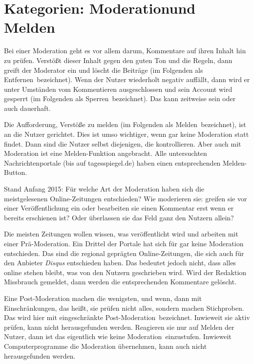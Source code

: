 \section{Kategorien: \glqq Moderation\grqq und \glqq Melden\grqq}

Bei einer Moderation geht es vor allem darum, Kommentare auf ihren Inhalt hin
zu prüfen. Verstößt dieser Inhalt gegen den guten Ton und die Regeln, dann
greift der Moderator ein und löscht die Beiträge (im Folgenden als \glqq
Entfernen\grqq\ bezeichnet). Wenn der Nutzer wiederholt negativ auffällt, dann
wird er unter Umständen vom Kommentieren ausgeschlossen und sein Account wird
gesperrt (im Folgenden als  \glqq Sperren\grqq\ bezeichnet). Das kann zeitweise
sein oder auch dauerhaft.

Die Aufforderung, Verstöße zu melden (im Folgenden als \glqq Melden\grqq\
bezeichnet), ist an die Nutzer gerichtet. Dies ist umso wichtiger, wenn gar
keine Moderation statt findet. Dann sind die Nutzer selbst diejenigen, die
kontrollieren. Aber auch mit Moderation ist eine Melden-Funktion angebracht.
Alle  untersuchten Nachrichtenportale (bis auf tagesspiegel.de) haben einen
entsprechenden Melden-Button.

Stand Anfang 2015: Für welche Art der Moderation haben sich die meistgelesenen
Online-Zeitungen entschieden? Wie moderieren sie: greifen sie vor einer
Veröffentlichung ein oder bearbeiten sie einen Kommentar erst wenn er bereits
erschienen ist? Oder überlassen sie das Feld ganz den Nutzern allein?

Die meisten Zeitungen wollen wissen, was veröffentlicht wird und arbeiten mit
einer Prä-Moderation.  Ein Drittel der Portale hat sich für gar keine
Moderation entschieden. Das sind die regional geprägten Online-Zeitungen, die
sich auch für den Anbieter {\sl Disqus} entschieden haben. Das bedeutet jedoch
nicht, dass alles online stehen bleibt, was von den Nutzern geschrieben wird.
Wird der Redaktion Missbrauch gemeldet, dann werden die entsprechenden
Kommentare gelöscht.

Eine Post-Moderation machen die wenigsten, und wenn, dann mit Einschränkungen,
das heißt, sie prüfen nicht alles, sondern machen Stichproben. Das wird hier mit
\glqq eingeschränkte Post-Moderation\grqq\ bezeichnet. Inwieweit sie aktiv prüfen,
kann nicht herausgefunden werden. Reagieren sie nur auf Melden der Nutzer, dann
ist das eigentlich wie \glqq keine Moderation\grqq\ einzustufen.
Inwieweit Computerprogramme die Moderation übernehmen, kann auch nicht
herausgefunden werden.


